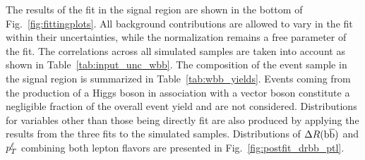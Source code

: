 The results of the fit in the \wbb signal region
 are shown in the bottom of Fig.~\ref{fig:fittingplots}.
All background contributions are allowed to vary
 in the fit within their uncertainties,
 while the \wbb normalization remains a free parameter of the fit.
The correlations across all simulated samples are taken into account
 as shown in Table~\ref{tab:input_unc_wbb}.
The composition of the event sample in
 the signal region is summarized in Table~\ref{tab:wbb_yields}.
Events coming from the production of a Higgs boson in association
 with a vector boson constitute a negligible fraction of the
 overall event yield and are not considered.
Distributions for variables other than those being directly fit are
 also produced by applying the results from the three fits to
 the simulated samples.
Distributions of $\Delta R(\mathrm{b\overline{b}})$ and $p_T^\ell$
 combining both lepton flavors are presented in Fig.~\ref{fig:postfit_drbb_ptl}.

